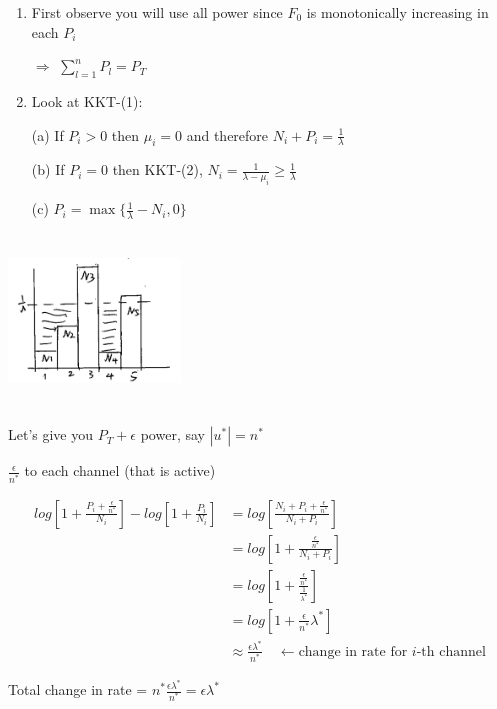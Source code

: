 \begin{enumerate}
	\item First observe you will use all power since $F_0$ is monotonically increasing in each $P_i$
	
	$\Rightarrow$ $\sum^n_{l=1}P_l = P_T$
	
	\item Look at KKT-(1):
	
	(a) If $P_i>0$ then $\mu_i = 0$ and therefore $N_i+P_i = \frac{1}{\lambda}$
	
	(b) If $P_i= 0$ then KKT-(2), $N_i = \frac{1}{\lambda - \mu_i}\geq \frac{1}{\lambda}$
	
	(c) $P_i = \max\{\frac{1}{\lambda}-N_i, 0 \}$
\end{enumerate}
\begin{marginfigure}
	\centering
	\includegraphics[width=1.8in,height=1.8in]{figures/ch10/figure1204_2.png}
\end{marginfigure}





Let's give you $P_T+\epsilon$ power, say $|u^*| = n^*$

$\frac{\epsilon}{n^*}$ to each channel (that is active)

\begin{align*}
log[1+\frac{P_i+\frac{\epsilon}{n^*}}{N_i}] - log[1+\frac{P_i}{N_i}] &= log[\frac{N_i+P_i+\frac{\epsilon}{n^*}}{N_i+P_i}]\\
&= log[1+\frac{\frac{\epsilon}{n^*}}{N_i+P_i}] \\
&= log[1+\frac{\frac{\epsilon}{n^*}}{\frac{1}{\lambda^*}}]\\
&= log[1+\frac{\epsilon}{n^*}\lambda^*]\\
&\approx \frac{\epsilon\lambda^*}{n^*} \quad\leftarrow \text{change in rate for $i$-th channel}
\end{align*}

Total change in rate  = $n^*\frac{\epsilon\lambda^*}{n^*} = \epsilon \lambda^*$


